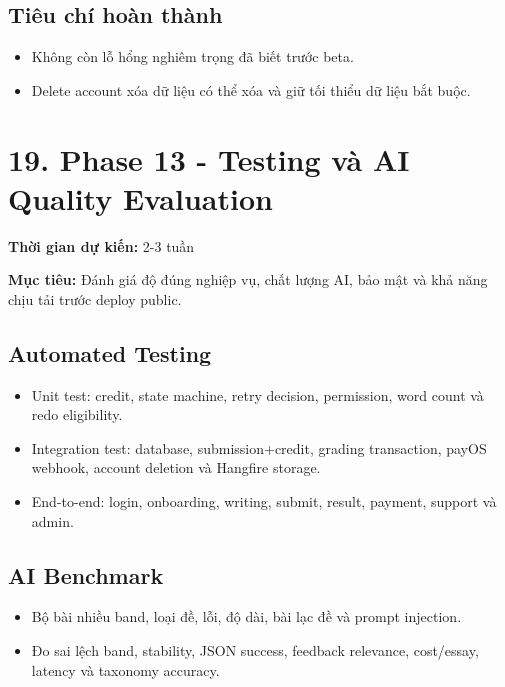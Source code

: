 \documentclass[
  11pt,
  a4paper,
]{article}
\begin{document}
\subsection{Tiêu chí hoàn
thành}\label{tiuxeau-chuxed-houxe0n-thuxe0nh-12}

\begin{itemize}
\item
  Không còn lỗ hổng nghiêm trọng đã biết trước beta.
\item
  Delete account xóa dữ liệu có thể xóa và giữ tối thiểu dữ liệu bắt
  buộc.
\end{itemize}

\section{19. Phase 13 - Testing và AI Quality
Evaluation}\label{phase-13---testing-vuxe0-ai-quality-evaluation}

\textbf{Thời gian dự kiến:} 2-3 tuần

\textbf{Mục tiêu:} Đánh giá độ đúng nghiệp vụ, chất lượng AI, bảo mật và
khả năng chịu tải trước deploy public.

\subsection{Automated Testing}\label{automated-testing}

\begin{itemize}
\item
  Unit test: credit, state machine, retry decision, permission, word
  count và redo eligibility.
\item
  Integration test: database, submission+credit, grading transaction,
  payOS webhook, account deletion và Hangfire storage.
\item
  End-to-end: login, onboarding, writing, submit, result, payment,
  support và admin.
\end{itemize}

\subsection{AI Benchmark}\label{ai-benchmark}

\begin{itemize}
\item
  Bộ bài nhiều band, loại đề, lỗi, độ dài, bài lạc đề và prompt
  injection.
\item
  Đo sai lệch band, stability, JSON success, feedback relevance,
  cost/essay, latency và taxonomy accuracy.
\end{itemize}
\end{document}
